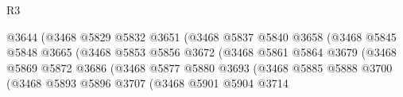 \begin{lexlean}{R3}
\begin{coremodule}
                                                @3644
                                                (@3468
                                                  @5829
                                                  @5832
                                                  @3651
                                                  (@3468
                                                    @5837
                                                    @5840
                                                    @3658
                                                    (@3468
                                                      @5845
                                                      @5848
                                                      @3665
                                                      (@3468
                                                        @5853
                                                        @5856
                                                        @3672
                                                        (@3468
                                                          @5861
                                                          @5864
                                                          @3679
                                                          (@3468
                                                            @5869
                                                            @5872
                                                            @3686
                                                            (@3468
                                                              @5877
                                                              @5880
                                                              @3693
                                                              (@3468
                                                                @5885
                                                                @5888
                                                                @3700
                                                                (@3468
                                                                  @5893
                                                                  @5896
                                                                  @3707
                                                                  (@3468
                                                                    @5901
                                                                    @5904
                                                                    @3714

\end{coremodule}
\end{lexlean}
